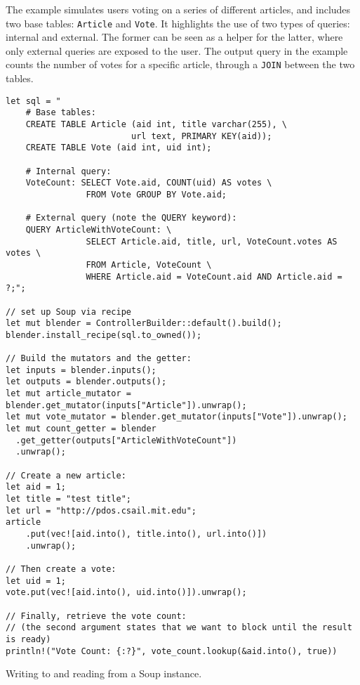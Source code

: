 \documentclass[b5paper]{report}
\begin{document}
The example simulates users voting on a series of different articles, and
includes two base tables: \texttt{Article} and \texttt{Vote}. It highlights the
use of two types of queries: internal and external. The former can be seen as a
helper for the latter, where only external queries are exposed to the user. The
output query in the example counts the number of votes for a specific article,
through a \texttt{JOIN} between the two tables.


\begin{listing}[H]
  \vspace*{-1.1in}
  \begin{verbatim}
let sql = "
    # Base tables:
    CREATE TABLE Article (aid int, title varchar(255), \
                         url text, PRIMARY KEY(aid));
    CREATE TABLE Vote (aid int, uid int);

    # Internal query:
    VoteCount: SELECT Vote.aid, COUNT(uid) AS votes \
                FROM Vote GROUP BY Vote.aid;

    # External query (note the QUERY keyword):
    QUERY ArticleWithVoteCount: \
                SELECT Article.aid, title, url, VoteCount.votes AS votes \
                FROM Article, VoteCount \
                WHERE Article.aid = VoteCount.aid AND Article.aid = ?;";

// set up Soup via recipe
let mut blender = ControllerBuilder::default().build();
blender.install_recipe(sql.to_owned());

// Build the mutators and the getter:
let inputs = blender.inputs();
let outputs = blender.outputs();
let mut article_mutator = blender.get_mutator(inputs["Article"]).unwrap();
let mut vote_mutator = blender.get_mutator(inputs["Vote"]).unwrap();
let mut count_getter = blender
  .get_getter(outputs["ArticleWithVoteCount"])
  .unwrap();

// Create a new article:
let aid = 1;
let title = "test title";
let url = "http://pdos.csail.mit.edu";
article
    .put(vec![aid.into(), title.into(), url.into()])
    .unwrap();

// Then create a vote:
let uid = 1;
vote.put(vec![aid.into(), uid.into()]).unwrap();

// Finally, retrieve the vote count:
// (the second argument states that we want to block until the result is ready)
println!("Vote Count: {:?}", vote_count.lookup(&aid.into(), true))
  \end{verbatim}
  \caption{
    Writing to and reading from a Soup instance.
    \label{lst:soup-example}
  }
\end{listing}
\end{document}
